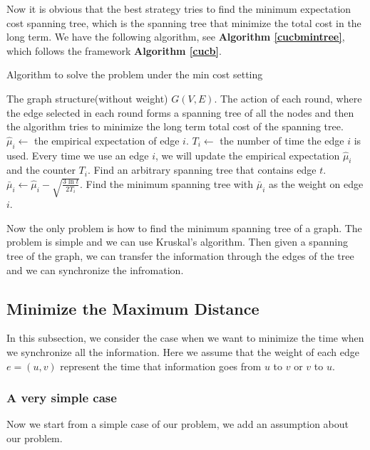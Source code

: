 \documentclass{article}
\theoremstyle{plain}
\theoremstyle{definition}
\theoremstyle{remark}
\begin{document}
    Now it is obvious that the best strategy tries to find the minimum expectation cost spanning tree, which is the spanning tree that minimize the total cost in the long term. We have the following algorithm, see \textbf{Algorithm \ref{cucbmintree}}, which follows the framework \textbf{Algorithm \ref{cucb}}.

    \begin{algorithm}
        \caption{Algorithm to solve the problem under the min cost setting}
        \label{cucbmintree}
        \begin{algorithmic}[1]
        \Require The graph structure(without weight) $G(V,E)$.
        \Ensure The action of each round, where the edge selected in each round forms a spanning tree of all the nodes and then the algorithm tries to minimize the long term total cost of the spanning tree.
            \State $\hat \mu_i \leftarrow$ the empirical expectation of edge $i$.
            \State $T_i \leftarrow$ the number of time the edge $i$ is used.
            \State Every time we use an edge $i$, we will update the empirical expectation $\hat \mu_i$ and the counter $T_i$.
                \State Find an arbitrary spanning tree that contains edge $t$.
            \EndFor
                \State $\bar\mu_i \leftarrow \hat\mu_i - \sqrt{\frac{3\ln t}{2T_i}}$.
                \State Find the minimum spanning tree with $\bar\mu_i$ as the weight on edge $i$.
            \EndFor
        \EndProcedure
        \end{algorithmic}
    \end{algorithm}

    Now the only problem is how to find the minimum spanning tree of a graph. The problem is simple and we can use Kruskal's algorithm. Then given a spanning tree of the graph, we can transfer the information through the edges of the tree and we can synchronize the infromation.

    \subsection{Minimize the Maximum Distance}
    In this subsection, we consider the case when we want to minimize the time when we synchronize all the information. Here we assume that the weight of each edge $e = (u,v)$ represent the time that information goes from $u$ to $v$ or $v$ to $u$.

    \subsubsection{A very simple case}
    Now we start from a simple case of our problem, we add an assumption about our problem.\\
    
\end{document}
